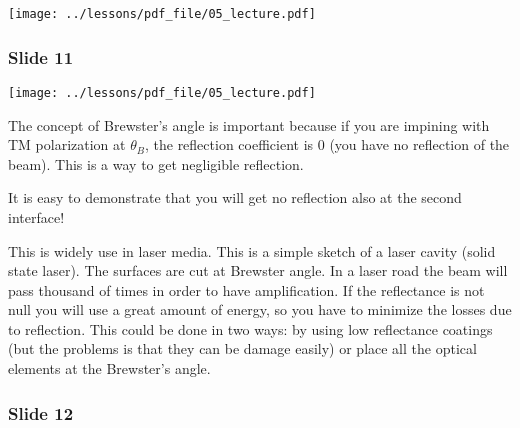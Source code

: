 \documentclass[../main/main.tex]{subfiles}
\begin{document}
\begin{minipage}[]{0.5\linewidth}
\centering
\texttt{[image: ../lessons/pdf\_file/05\_lecture.pdf]}
\end{minipage}
\hspace{0.3cm}\vspace{0.3cm}
\begin{minipage}[c]{0.47\linewidth}


\end{minipage}

\subsubsection*{Slide 11}

\begin{minipage}[]{0.5\linewidth}
\centering
\texttt{[image: ../lessons/pdf\_file/05\_lecture.pdf]}
\end{minipage}
\hspace{0.3cm}\vspace{0.3cm}
\begin{minipage}[c]{0.47\linewidth}

The concept of Brewster's angle is important because if you are impining with TM polarization at \( \theta _B \), the reflection coefficient is 0 (you have no reflection of the beam). This is a way to get negligible reflection.

It is easy to demonstrate that you will get no reflection also at the second interface!

This is widely use in laser media. This is a simple sketch of a laser cavity (solid state laser). The surfaces are cut at Brewster angle. In a laser road the beam will pass thousand of times in order to have amplification. If the reflectance is not null you will use a great amount of energy, so you have to minimize the losses due to reflection. This could be done in two ways: by using low reflectance coatings (but the problems is that they can be damage easily) or place all the optical elements at the Brewster's angle.

\end{minipage}

\subsubsection*{Slide 12}
\end{document}

